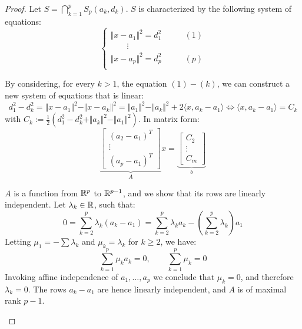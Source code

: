 \begin{proof}
Let $S = \bigcap_{k=1}^p S_p(a_k, d_k)$. $S$ is characterized by the following system of equations:
\[
\begin{cases}
    \Vert x-a_1\Vert^2 = d_1^2 \qquad &(1) \\
    \qquad \vdots \\
    \Vert x-a_p\Vert^2 = d_p^2 \qquad &(p) \\
\end{cases}
\]

By considering, for every $k>1$, the equation $(1) - (k)$, we can construct a new system of equations that is linear:
\[
    d_1^2 - d_k^2 = \Vert x-a_1\Vert^2 - \Vert x-a_k\Vert^2 = \Vert a_1\Vert^2 - \Vert a_k\Vert^2 + 2\langle x, a_k-a_1\rangle \iff \langle x, a_k-a_1\rangle = C_k
\]
with $C_k := \frac{1}{2}(d_1^2 - d_k^2 + \Vert a_k\Vert^2 - \Vert a_1\Vert^2)$. In matrix form:
\[
\underbrace{
\begin{bmatrix}
    (a_2 - a_1)^T \\
    \vdots \\
    (a_p - a_1)^T
\end{bmatrix}}_A x =
\underbrace{
\begin{bmatrix}
    C_2 \\
    \vdots \\
    C_m
\end{bmatrix}}_b
\]

$A$ is a function from $\mathbb R^p$ to $\mathbb R^{p-1}$, and we show that its rows are linearly independent. Let $\lambda_k\in\mathbb R$, such that:
\[
    0 = \sum_{k=2}^p \lambda_k (a_k - a_1) =  \sum_{k=2}^p \lambda_k a_k - \left(\sum_{k=2}^p \lambda_k\right)a_1
\]
Letting $\mu_1 = -\sum \lambda_k$ and $\mu_k = \lambda_k$ for $k\geq 2$, we have:
\[
    \sum_{k=1}^p \mu_k a_k = 0, \qquad \sum_{k=1}^p \mu_k = 0
\]
Invoking affine independence of $a_1,\dots,a_p$ we conclude that $\mu_k = 0$, and therefore $\lambda_k = 0$. The rows $a_k - a_1$ are hence linearly independent, and $A$ is of maximal rank $p-1$.

\begin{figure}[ht]
    \centering
\end{figure}
\end{proof}
